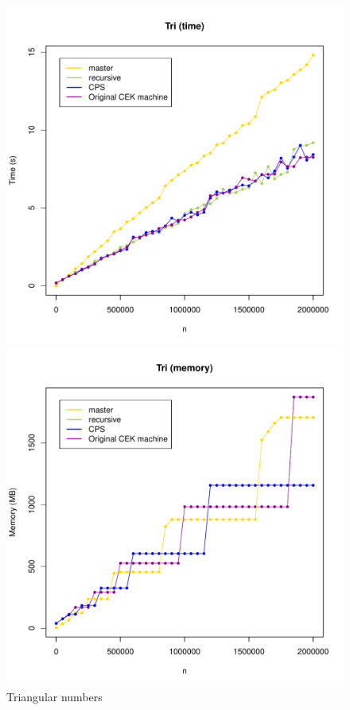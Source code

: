 \documentclass[a4paper]{article}
\begin{document}
\begin{figure}[H]
\centering
\includegraphics[width=0.8\linewidth]{tri-times.pdf}

\includegraphics[width=0.8\linewidth]{tri-mem.pdf}
\caption{Triangular numbers}\label{fig:tri-graphs}
\end{figure}
\newpage
\end{document}
